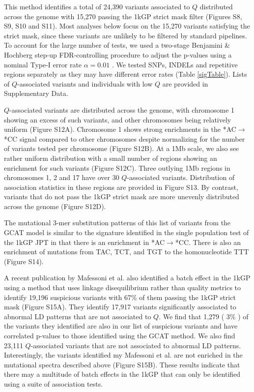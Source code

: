 \documentclass[9pt,article]{template}
\begin{document}
This method identifies a total of 24,390 variants associated to $Q$ distributed across the genome with 15,270 passing the 1kGP strict mask filter (Figures S8, S9, S10 and S11). 
Most analyses below focus on the 15,270 variants satisfying the strict mask, since these variants are unlikely to be filtered by standard pipelines.
To account for the large number of tests, we used a two-stage Benjamini \& Hochberg step-up FDR-controlling procedure to adjust the p-values using a nominal Type-I error rate $\alpha = 0.01$ \citep{Benjamini2006}. 
We tested SNPs, INDELs and repetitive regions separately as they may have different error rates (Table \ref{sigTable}).
Lists of $Q$-associated variants and individuals with low $Q$ are provided in Supplementary Data.

$Q$-associated variants are distributed across the genome, with chromosome 1 showing an excess of such variants, and other chromosomes being relatively uniform (Figure S12A). %
Chromosome 1 shows strong enrichments in the  *AC${\rightarrow}$*CC signal compared to other chromosomes despite normalizing for the number of variants tested per chromosome (Figure S12B). %
At a 1Mb scale, we also see rather uniform distribution with a small number of regions showing an enrichment for such variants (Figure S12C). %
Three outlying 1Mb regions in chromosomes 1, 2 and 17 have over 30 $Q$-associated variants.
Distribution of association statistics in these regions are provided in Figure S13. %
By contrast, variants that do not pass the 1kGP strict mask are more unevenly distributed across the genome (Figure S12D). %

The mutational 3-mer substitution patterns of this list of variants from the GCAT model is similar to the signature identified in the single population test of the 1kGP JPT in that there is an enrichment in *AC${\rightarrow}$*CC.
There is also an enrichment of mutations from TAC, TCT, and TGT to the homonucleotide TTT (Figure S14). %


A recent publication by Mafessoni et al. also identified a batch effect in the 1kGP using a method that uses linkage disequilibrium rather than quality metrics to identify 19,196 suspicious variants with 67\% of them passing the 1kGP strict mask \citep{mafessoni2018turning} (Figure S15A). %
They identify 17,917 variants significantly associated to abnormal LD patterns that are not associated to $Q$.
We find that 1,279 ( 3\% ) of the variants they identified are also in our list of suspicious variants and have correlated p-values to those identified using the GCAT method.
We also find 23,111 $Q$-associated variants that are not associated to abnormal LD patterns. 
Interestingly, the variants identified my Mafessoni et al. are not enriched in the mutational spectra described above (Figure S15B).
These results indicate that there may a multitude of batch effects in the 1kGP that can only be identified using a suite of association tests.
\end{document}

